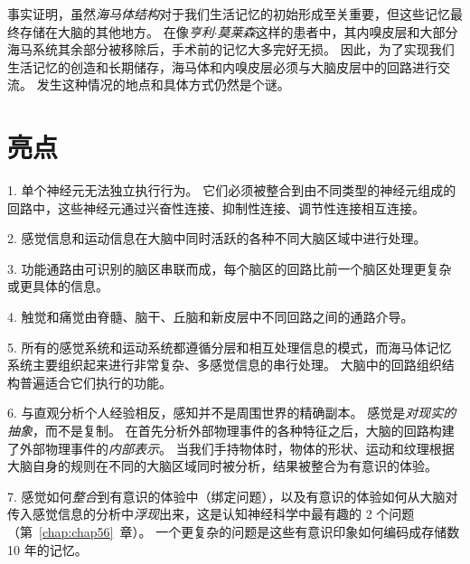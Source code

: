 事实证明，虽然\textit{海马体结构}对于我们生活记忆的初始形成至关重要，但这些记忆最终存储在大脑的其他地方。
在像\textit{亨利$\cdot$莫莱森}这样的患者中，其内嗅皮层和大部分海马系统其余部分被移除后，手术前的记忆大多完好无损。
因此，为了实现我们生活记忆的创造和长期储存，海马体和内嗅皮层必须与大脑皮层中的回路进行交流。
发生这种情况的地点和具体方式仍然是个谜。



\section{亮点}

1. 单个神经元无法独立执行行为。
它们必须被整合到由不同类型的神经元组成的回路中，这些神经元通过兴奋性连接、抑制性连接、调节性连接相互连接。


2. 感觉信息和运动信息在大脑中同时活跃的各种不同大脑区域中进行处理。


3. 功能通路由可识别的脑区串联而成，每个脑区的回路比前一个脑区处理更复杂或更具体的信息。


4. 触觉和痛觉由脊髓、脑干、丘脑和新皮层中不同回路之间的通路介导。


5. 所有的感觉系统和运动系统都遵循分层和相互处理信息的模式，而海马体记忆系统主要组织起来进行非常复杂、多感觉信息的串行处理。
大脑中的回路组织结构普遍适合它们执行的功能。


6. 与直观分析个人经验相反，感知并不是周围世界的精确副本。
感觉是\textit{对现实的抽象}，而不是复制。
在首先分析外部物理事件的各种特征之后，大脑的回路构建了外部物理事件的\textit{内部表示}。
当我们手持物体时，物体的形状、运动和纹理根据大脑自身的规则在不同的大脑区域同时被分析，结果被整合为有意识的体验。


7. 感觉如何\textit{整合}到有意识的体验中（绑定问题），以及有意识的体验如何从大脑对传入感觉信息的分析中\textit{浮现}出来，这是认知神经科学中最有趣的 2 个问题（第~\ref{chap:chap56}~章）。
一个更复杂的问题是这些有意识印象如何编码成存储数 10 年的记忆。
























